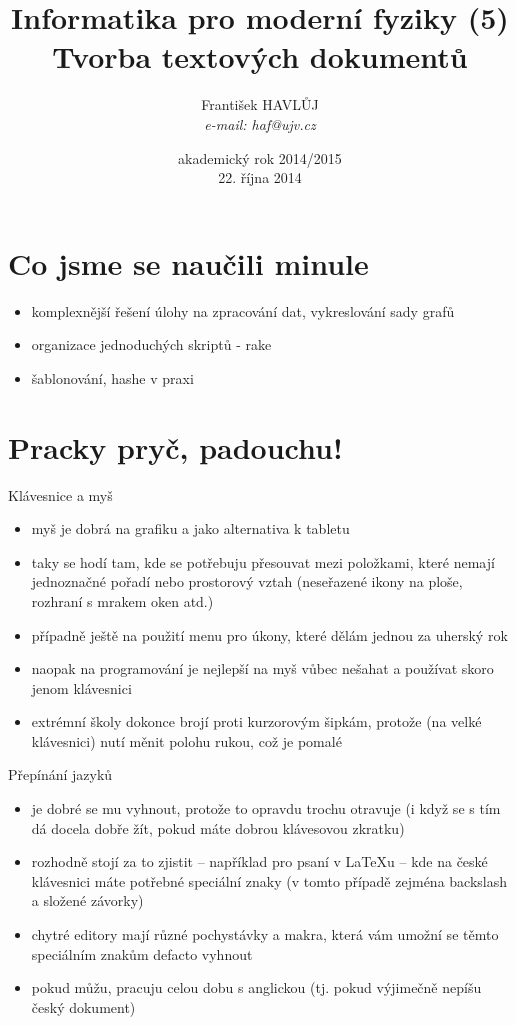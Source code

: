 \documentclass{beamer}
\title[IMF (5)]{Informatika pro moderní fyziky (5)\\ Tvorba textových dokumentů}
\author[Franti\v{s}ek HAVL\r{U}J, ORF ÚJV Řež]{Franti\v{s}ek HAVL\r{U}J\\{\scriptsize \emph{e-mail: haf@ujv.cz}}}
\date{akademický rok 2014/2015\\22. října 2014}
\institute[ORF ÚJV Řež]
{ÚJV Řež\\oddělení Reaktorové fyziky a podpory palivového cyklu}
\begin{document}
\begin{frame}
  \titlepage
\end{frame}

\begin{frame}
  \tableofcontents
\end{frame}

\section{Co jsme se naučili minule}

\begin{frame}{}
  \begin{itemize}
    \item komplexnější řešení úlohy na zpracování dat, vykreslování sady grafů
    \item organizace jednoduchých skriptů - rake
    \item šablonování, hashe v praxi
  \end{itemize}
\end{frame}

\section{Pracky pryč, padouchu!}

\begin{frame}{Klávesnice a myš}
  \begin{itemize}
    \item myš je dobrá na grafiku a jako alternativa k tabletu
    \item taky se hodí tam, kde se potřebuju přesouvat mezi položkami, které nemají jednoznačné pořadí nebo prostorový vztah (neseřazené ikony na ploše, rozhraní s mrakem oken atd.)
    \item případně ještě na použití menu pro úkony, které dělám jednou za uherský rok
    \item naopak na programování je nejlepší na myš vůbec nešahat a používat skoro jenom klávesnici
    \item extrémní školy dokonce brojí proti kurzorovým šipkám, protože (na velké klávesnici) nutí měnit polohu rukou, což je pomalé
  \end{itemize}
\end{frame}

\begin{frame}{Přepínání jazyků}
  \begin{itemize}
    \item je dobré se mu vyhnout, protože to opravdu trochu otravuje (i když se s tím dá docela dobře žít, pokud máte dobrou klávesovou zkratku)
    \item rozhodně stojí za to zjistit -- například pro psaní v LaTeXu -- kde na české klávesnici máte potřebné speciální znaky (v tomto případě zejména backslash a složené závorky)
    \item chytré editory mají různé pochystávky a makra, která vám umožní se těmto speciálním znakům defacto vyhnout
    \item pokud můžu, pracuju celou dobu s anglickou (tj. pokud výjimečně nepíšu český dokument)
  \end{itemize}
\end{frame}
\end{document}
